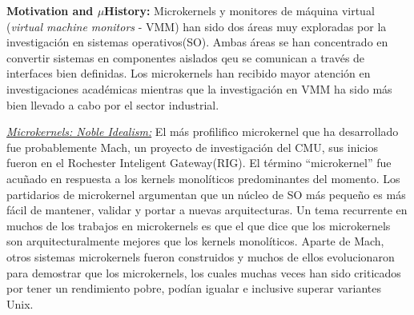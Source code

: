 \textbf{Motivation and $\mu$History:} Microkernels y monitores de máquina virtual (\emph{virtual machine monitors} - VMM) han sido dos áreas muy exploradas por la investigación en sistemas operativos(SO). Ambas áreas se han concentrado en convertir sistemas en componentes aislados qeu se comunican a través de interfaces bien definidas. Los microkernels han recibido mayor atención en investigaciones académicas mientras que la investigación en VMM ha sido más bien llevado a cabo por el sector industrial. 

\underline{\emph{Microkernels: Noble Idealism:}} El más profilifico microkernel que ha desarrollado fue probablemente Mach, un proyecto de investigación del CMU, sus inicios fueron en el Rochester Inteligent Gateway(RIG). El término ``microkernel'' fue acuñado en respuesta a los kernels monolíticos predominantes del momento. Los partidarios de microkernel argumentan que un núcleo de SO más pequeño es más fácil de mantener, validar y portar a nuevas arquitecturas. Un tema recurrente en muchos de los trabajos en microkernels es que el que dice que los microkernels son arquitecturalmente mejores que los kernels monolíticos.  Aparte de Mach, otros sistemas microkernels fueron construidos y muchos de ellos evolucionaron para demostrar que los microkernels, los cuales muchas veces han sido criticados por tener un rendimiento pobre, podían igualar e inclusive superar variantes Unix.

